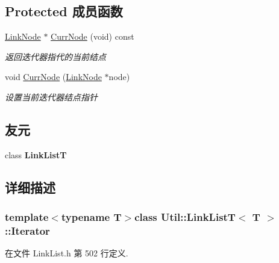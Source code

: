 \subsection*{Protected 成员函数}
\begin{DoxyCompactItemize}
\item 
\hyperlink{class_util_1_1_link_list_t_1_1_link_node}{Link\-Node} $\ast$ \hyperlink{class_util_1_1_link_list_t_1_1_iterator_ab4eb0a7e476bc9b7948ce8fc4ac75f8e}{Curr\-Node} (void) const 
\begin{DoxyCompactList}\small\item\em 返回迭代器指代的当前结点 \end{DoxyCompactList}\item 
void \hyperlink{class_util_1_1_link_list_t_1_1_iterator_af4f3c41800abeb38949f49fbfe0b27d3}{Curr\-Node} (\hyperlink{class_util_1_1_link_list_t_1_1_link_node}{Link\-Node} $\ast$node)
\begin{DoxyCompactList}\small\item\em 设置当前迭代器结点指针 \end{DoxyCompactList}\end{DoxyCompactItemize}
\subsection*{友元}
\begin{DoxyCompactItemize}
\item 
\hypertarget{class_util_1_1_link_list_t_1_1_iterator_a4b02bb15a329bfedcc19f00342bb4b49}{class {\bfseries Link\-List\-T}}\label{class_util_1_1_link_list_t_1_1_iterator_a4b02bb15a329bfedcc19f00342bb4b49}

\end{DoxyCompactItemize}


\subsection{详细描述}
\subsubsection*{template$<$typename T$>$class Util\-::\-Link\-List\-T$<$ T $>$\-::\-Iterator}



在文件 Link\-List.\-h 第 502 行定义.



